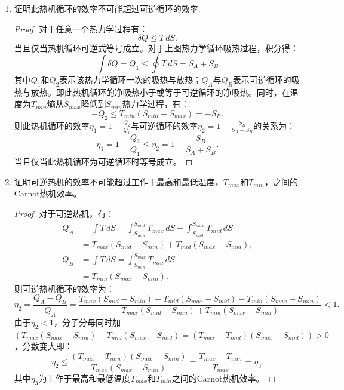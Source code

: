 \documentclass[reqno,a4paper,12pt]{amsart}
\begin{document}
	\begin{enumerate}
		\item 证明此热机循环的效率不可能超过可逆循环的效率.
		\begin{proof}
			对于任意一个热力学过程有：
			\[
				\delta Q \leq T\,dS.
			\]
			当且仅当热机循环可逆式等号成立。对于上图热力学循环吸热过程，积分得：
			\[
				\int \delta Q = Q_1 \leq \oint T\,dS = S_A + S_B
			\]
			其中$Q_1$和$Q_2$表示该热力学循环一次的吸热与放热；$Q_A$与$Q_B$表示可逆循环的吸热与放热。即此热机循环的净吸热小于或等于可逆循环的净吸热。同时，在温度为$T_{min}$熵从$S_{max}$降低到$S_{min}$热力学过程，有：
			\[
				-Q_2 \leq T_{min}(S_{min}-S_{max}) = -S_B.
			\]
			则此热机循环的效率$\eta_1 = 1-\frac{Q_2}{Q_1}$与可逆循环的效率$\eta_2 = 1-\frac{S_B}{S_A+S_B}$的关系为：
			\[
				\eta_1 = 1-\frac{Q_2}{Q_1} \leq \eta_2 = 1-\frac{S_B}{S_A+S_B}.
			\]
			当且仅当此热机循环为可逆循环时等号成立。
		\end{proof}

		\item 证明可逆热机的效率不可能超过工作于最高和最低温度，$T_{max}$和$T_{min}$，之间的Carnot热机效率。
		\begin{proof}
			对于可逆热机，有：
			\begin{align*}
				Q_A &= \int T\,dS = \int_{S_{min}}^{S_{mid}} T_{max}\,dS + \int_{S_{mid}}^{S_{max}} T_{mid}\,dS \\ 
				&= T_{max}(S_{mid}-S_{min}) + T_{mid}(S_{max}-S_{mid}), \\
				Q_B &= \int T\,dS = \int_{S_{min}}^{S_{max}} T_{min}\,dS \\
				&= T_{min}(S_{max}-S_{min}).
			\end{align*}
			则可逆热机循环的效率为：
			\[
				\eta_2 = \frac{Q_A-Q_B}{Q_A} = \frac{T_{max}(S_{mid}-S_{min}) + T_{mid}(S_{max}-S_{mid}) - T_{min}(S_{max}-S_{min})}{T_{max}(S_{mid}-S_{min}) + T_{mid}(S_{max}-S_{mid})} < 1.
			\]
			由于$\eta_2<1$，分子分母同时加$(T_{max}(S_{max}-S_{mid}) - T_{mid}(S_{max}-S_{mid}) = (T_{max}-T_{mid})(S_{max}-S_{mid})) > 0$，分数变大即：
			\[
				\eta_2 \leq \frac{(T_{max}-T_{min})(S_{max}-S_{min})}{T_{max}(S_{max}-S_{min})} = \frac{T_{max}-T_{min}}{T_{max}} = \eta_3.
			\]
			其中$\eta_3$为工作于最高和最低温度$T_{max}$和$T_{min}$之间的Carnot热机效率。
		\end{proof}
	\end{enumerate}
\end{document}
